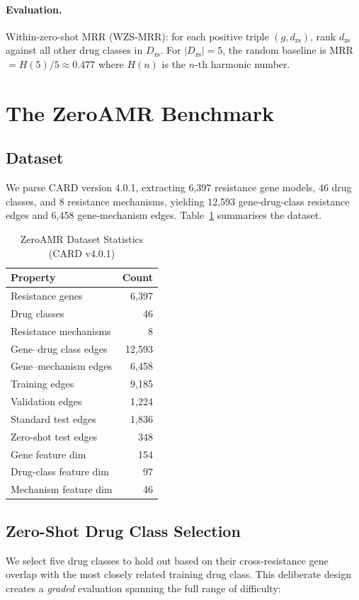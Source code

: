 \documentclass[conference]{IEEEtran}
\begin{document}
\paragraph{Evaluation.}
Within-zero-shot MRR (WZS-MRR): for each positive triple
$(g, d_{\text{zs}})$, rank $d_{\text{zs}}$ against all other drug
classes in $D_{\text{zs}}$. For $|D_{\text{zs}}| = 5$, the random
baseline is MRR $= H(5)/5 \approx 0.477$ where $H(n)$ is the $n$-th
harmonic number.


\section{The ZeroAMR Benchmark}
\label{sec:benchmark}

\subsection{Dataset}
We parse CARD version 4.0.1, extracting 6,397 resistance gene models,
46 drug classes, and 8 resistance mechanisms, yielding 12,593
gene-drug-class resistance edges and 6,458 gene-mechanism edges.
Table~\ref{tab:dataset} summarises the dataset.

\begin{table}[h]
\centering
\caption{ZeroAMR Dataset Statistics (CARD v4.0.1)}
\label{tab:dataset}
\begin{tabular}{lr}
\toprule
\textbf{Property} & \textbf{Count} \\
\midrule
Resistance genes & 6,397 \\
Drug classes & 46 \\
Resistance mechanisms & 8 \\
Gene–drug class edges & 12,593 \\
Gene–mechanism edges & 6,458 \\
Training edges & 9,185 \\
Validation edges & 1,224 \\
Standard test edges & 1,836 \\
Zero-shot test edges & 348 \\
\midrule
Gene feature dim & 154 \\
Drug-class feature dim & 97 \\
Mechanism feature dim & 46 \\
\bottomrule
\end{tabular}
\end{table}

\subsection{Zero-Shot Drug Class Selection}
\label{sec:zs_selection}
We select five drug classes to hold out based on their cross-resistance
gene overlap with the most closely related training drug class.
This deliberate design creates a \emph{graded} evaluation spanning the
full range of difficulty:
\end{document}
